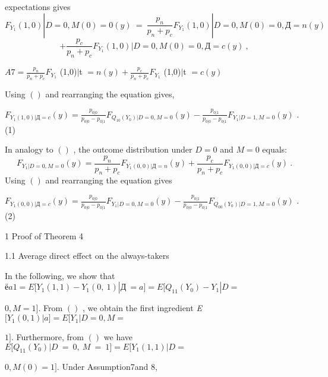 \documentclass[a4paper,12pt]{article}
\begin{document}
expectations gives
$$
F_{Y_{1}}(1,0)|D=0,M(0)=0(y)\ =\ \frac{p_{n}}{p_{n}+p_{c}}F_{Y_{1}}(1,0)|D=0,M(0)=0,Д=n(y)
$$
$$
+\frac{p_{c}}{p_{n}+p_{c}}F_{Y_{1}}(1,0)|D=0,M(0)=0,Д=c(y)\ ,
$$
\begin{center}
$A7= \displaystyle \frac{p_{n}}{p_{n}+p_{c}}F_{Y_{1}}$ (1,0)$|$t $=n(y) + \displaystyle \frac{p_{c}}{p_{n}+p_{c}}F_{Y_{1}}$ (1,0)$|$t $=c(y)$
\end{center}
Using $()$ and rearranging the equation gives,

$F_{Y_{1}(1,0)|Д=c}(y)=\displaystyle \frac{p_{0|0}}{p_{0|0}-p_{0|1}}F_{Q_{10}(Y_{0})|D=0,M=0}(y)-\frac{p_{0|1}}{p_{0|0}-p_{0|1}}F_{Y_{1}|D=1,M=0}(y)$ . (1)

In analogy to $()$ , the outcome distribution under $D=0$ and $M=0$ equals:
$$
F_{Y_{1}|D=0,M=0}(y)=\frac{p_{n}}{p_{n}+p_{c}}F_{Y_{1}(0,0)|Д=n}(y)+\frac{p_{c}}{p_{n}+p_{c}}F_{Y_{1}(0,0)|Д=c}(y)\ .
$$
Using $()$ and rearranging the equation gives

$F_{Y_{1}(0,0)|Д=c}(y)=\displaystyle \frac{p_{0|0}}{p_{0|0}-p_{0|1}}F_{Y_{1}|D=0,M=0}(y)-\frac{p_{0|1}}{p_{0|0}-p_{0|1}}F_{Q_{00}(Y_{0})|D=1,M=0}(y)$ . (2)

1 Proof of Theorem 4

1.1 Average direct effect on the always-takers

In the following, we show that $ё a1=E[Y_{1}(1,1)-Y_{1}(0,\ 1)|Д\ =a]=E[Q_{11}(Y_{0})-Y_{1}|D=$

$0, M=1]$. From $()$ , we obtain the first ingredient {\it E} $[Y_{1}(0,1)|a]=E[Y_{1}|D=0, M=$

$1]$. Furthermore, from $()$ we have $E[Q_{11}(Y_{0})|D\ =\ 0,\ M\ =\ 1] = E[Y_{1}(1,1)|D =$

$0, M(0)=1]$. Under Assumption7and 8,
\end{document}
